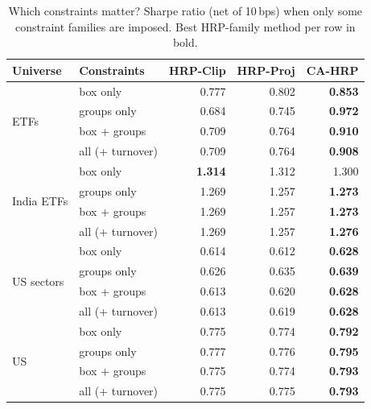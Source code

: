 \begin{table}[!htbp]\centering\small
\caption{Which constraints matter? Sharpe ratio (net of 10\,bps) when only some constraint families are imposed. Best HRP-family method per row in bold.}\label{tab:decomp}
\setlength{\tabcolsep}{4pt}\begin{tabular}{ll rrr}\toprule
Universe & Constraints & HRP-Clip & HRP-Proj & CA-HRP\\\midrule
\multirow{4}{*}{ETFs} & box only & 0.777 & 0.802 & \textbf{0.853}\\
 & groups only & 0.684 & 0.745 & \textbf{0.972}\\
 & box + groups & 0.709 & 0.764 & \textbf{0.910}\\
 & all (+ turnover) & 0.709 & 0.764 & \textbf{0.908}\\
\midrule
\multirow{4}{*}{India ETFs} & box only & \textbf{1.314} & 1.312 & 1.300\\
 & groups only & 1.269 & 1.257 & \textbf{1.273}\\
 & box + groups & 1.269 & 1.257 & \textbf{1.273}\\
 & all (+ turnover) & 1.269 & 1.257 & \textbf{1.276}\\
\midrule
\multirow{4}{*}{US sectors} & box only & 0.614 & 0.612 & \textbf{0.628}\\
 & groups only & 0.626 & 0.635 & \textbf{0.639}\\
 & box + groups & 0.613 & 0.620 & \textbf{0.628}\\
 & all (+ turnover) & 0.613 & 0.619 & \textbf{0.628}\\
\midrule
\multirow{4}{*}{US} & box only & 0.775 & 0.774 & \textbf{0.792}\\
 & groups only & 0.777 & 0.776 & \textbf{0.795}\\
 & box + groups & 0.775 & 0.774 & \textbf{0.793}\\
 & all (+ turnover) & 0.775 & 0.775 & \textbf{0.793}\\
\bottomrule
\end{tabular}\end{table}